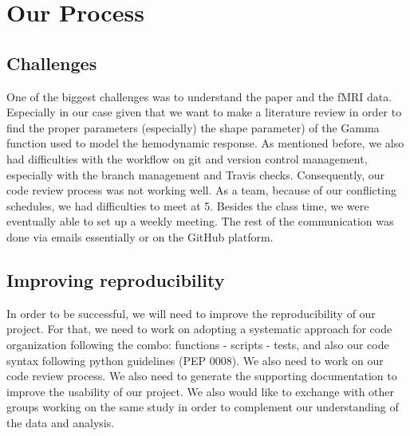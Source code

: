 \section{Our Process}
\subsection{Challenges}
\noindent
One of the biggest challenges was to understand the paper and the fMRI data.
Especially in our case given that we want to make a literature review in order
to find the proper parameters (especially) the shape parameter) of the Gamma 
function used to model the hemodynamic response.  
As mentioned before, we also had difficulties with the workflow on git and 
version control management, especially with the branch management and Travis
checks. Consequently, our code review process was not working well. 
As a team, because of our conflicting schedules, we had difficulties to meet
at 5. Besides the class time, we were eventually able to set up a weekly
meeting. The rest of the communication was done via emails essentially or on 
the GitHub platform. 

\subsection{Improving reproducibility}
\noindent
In order to be successful, we will need to improve the reproducibility of our
project. For that, we need to work on adopting a systematic approach for code 
organization following the combo: functions - scripts - tests, and also our 
code syntax following python guidelines (PEP 0008). We also need to work on 
our code review process. 
We also need to generate the supporting documentation to improve the usability
of our project. 
We also would like to exchange with other groups working on the same study in 
order to complement our understanding of the data and analysis.
